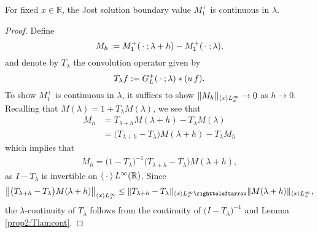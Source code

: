 \documentclass[../dissertation.tex]{subfiles}
\begin{document}
\begin{lma}\label{lma4:Mlamcont}
	For fixed $x\in \mathbb R$, the Jost solution boundary value $M_1^+$ is continuous 
	in $\lambda$.
\end{lma}
\begin{proof}
	Define
	\[
		M_h:= M_1^+(\kern 0.5ex \cdot \kern 0.5ex; \lambda +h) - M_1^+(\kern 0.5ex \cdot \kern 0.5ex; \lambda),
 	\]
 	and denote by $T_\lambda$ the convolution operator given by 
 	\[
 		T_\lambda f := G_L^+(\kern 0.5ex \cdot \kern 0.5ex; \lambda) * (u\, f).
 	\]
 	To show $M_1^+$ is continuous in $\lambda$, it suf{}fices to show 
 	$\|M_h\|_{\left\langle x \right\rangle L_x^\infty} \to 0$ as $h \to 0$.
 	Recalling that $M(\lambda) = 1+ T_\lambda M(\lambda)$, we see that 
 	\begin{align*}
 		M_h 
 			&= T_{\lambda+h}M(\lambda+h) - T_{\lambda} M(\lambda) \\
 			&= \big(T_{\lambda+h} - T_\lambda\big) M(\lambda+h) 
 				- T_\lambda M_h
 	\end{align*}
 	which implies that
 	\begin{align}
 		M_h 
 			= 
 				\big(1-T_{\lambda}\big)^{-1} 
 				\big(T_{\lambda+h} - T_\lambda\big) M(\lambda+h),
 	\end{align}
 	as $I - T_\lambda$ is invertible on $\left\langle \kern 0.5ex \cdot \kern 0.5ex \right\rangle L^\infty(\mathbb R)$.
 	Since
 	\[
 		\left\|
 			\big(T_{\lambda+h} - T_\lambda\big)M(\lambda+h)
 		\right\|_{\inn{x}L_x^\infty}
 			\leq \|T_{\lambda+h} - T_\lambda\|_{\inn{x}L_x^\infty\toitself}
 					\|M(\lambda+h)\|_{\inn{x}L_x^\infty},
 	\]
 	the $\lambda$-continuity of $T_\lambda$ follows from the continuity of 
 	$\big(I - T_\lambda\big)^{-1}$ and Lemma \ref{prop2:Tlamcont}.
\end{proof}
\end{document}

